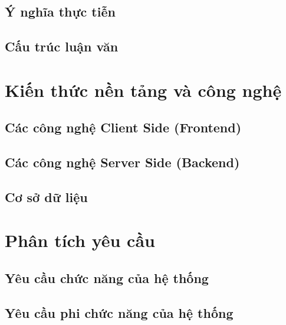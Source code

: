 \documentclass[a4paper,12pt,fleqn,print,oneside]{extarticle}
\begin{document}
\subsection{Ý nghĩa thực tiễn}


\subsection{Cấu trúc luận văn}





\newpage
\section{Kiến thức nền tảng và công nghệ}


\subsection{Các công nghệ Client Side (Frontend)}


\subsection{Các công nghệ Server Side (Backend)}


\subsection{Cơ sở dữ liệu}




\newpage
\section{Phân tích yêu cầu}

\subsection{Yêu cầu chức năng của hệ thống}


\subsection{Yêu cầu phi chức năng của hệ thống}

\end{document}
